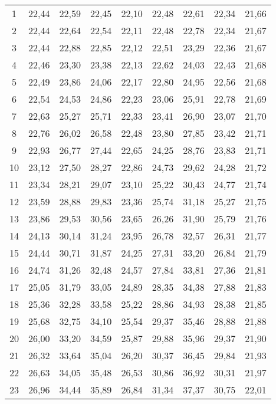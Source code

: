\begin{longtable}{c c c c c c c c c}
      1	  & 22,44 & 22,59 &	22,45 & 22,10 & 22,48 &	22,61 & 22,34 & 21,66 \\
      2	  & 22,44 & 22,64 &	22,54 & 22,11 & 22,48 &	22,78 & 22,34 & 21,67 \\
      3	  & 22,44 & 22,88 &	22,85 & 22,12 & 22,51 &	23,29 & 22,36 & 21,67 \\
      4	  & 22,46 & 23,30 &	23,38 & 22,13 & 22,62 &	24,03 & 22,43 & 21,68 \\
      5	  & 22,49 & 23,86 &	24,06 & 22,17 & 22,80 &	24,95 & 22,56 & 21,68 \\
      6	  & 22,54 & 24,53 &	24,86 & 22,23 & 23,06 &	25,91 & 22,78 & 21,69 \\
      7	  & 22,63 & 25,27 &	25,71 & 22,33 & 23,41 &	26,90 & 23,07 & 21,70 \\
      8	  & 22,76 & 26,02 &	26,58 & 22,48 & 23,80 &	27,85 & 23,42 & 21,71 \\
      9	  & 22,93 & 26,77 &	27,44 & 22,65 & 24,25 &	28,76 & 23,83 & 21,71 \\
      10	& 23,12	& 27,50	& 28,27	& 22,86	& 24,73	& 29,62	& 24,28	& 21,72 \\
      11	& 23,34	& 28,21	& 29,07	& 23,10	& 25,22	& 30,43	& 24,77	& 21,74 \\
      12	& 23,59	& 28,88	& 29,83	& 23,36	& 25,74	& 31,18	& 25,27	& 21,75 \\
      13	& 23,86	& 29,53	& 30,56	& 23,65	& 26,26	& 31,90	& 25,79	& 21,76 \\
      14	& 24,13	& 30,14	& 31,24	& 23,95	& 26,78	& 32,57	& 26,31	& 21,77 \\
      15	& 24,44	& 30,71	& 31,87	& 24,25	& 27,31	& 33,20	& 26,84	& 21,79 \\
      16	& 24,74	& 31,26	& 32,48	& 24,57	& 27,84	& 33,81	& 27,36	& 21,81 \\
      17	& 25,05	& 31,79	& 33,05	& 24,89	& 28,35	& 34,38	& 27,88	& 21,83 \\
      18	& 25,36	& 32,28	& 33,58	& 25,22	& 28,86	& 34,93	& 28,38	& 21,85 \\
      19	& 25,68	& 32,75	& 34,10	& 25,54	& 29,37	& 35,46	& 28,88	& 21,88 \\
      20	& 26,00	& 33,20	& 34,59	& 25,87	& 29,88	& 35,96	& 29,37	& 21,90 \\
      21	& 26,32	& 33,64	& 35,04	& 26,20	& 30,37	& 36,45	& 29,84	& 21,93 \\
      22	& 26,63	& 34,05	& 35,48	& 26,53	& 30,86	& 36,92	& 30,31	& 21,97 \\
      23	& 26,96	& 34,44	& 35,89	& 26,84	& 31,34	& 37,37	& 30,75	& 22,01 \\

\end{longtable}
